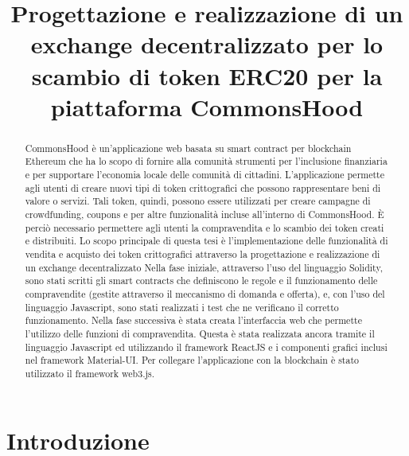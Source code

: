 \documentclass[a4paper]{article}
\title{Progettazione e realizzazione di un exchange decentralizzato per lo scambio di token ERC20 per la piattaforma CommonsHood}
\begin{document}
    \renewcommand{\abstractname}{Abstract}
    \begin{abstract}
      CommonsHood è un’applicazione web basata su smart contract per blockchain Ethereum che ha lo scopo di fornire alla comunità strumenti per l’inclusione finanziaria e per supportare l’economia locale delle comunità di cittadini.
      L’applicazione permette agli utenti di creare nuovi tipi di token crittografici che possono rappresentare  beni di valore o servizi. Tali token, quindi, possono essere utilizzati per creare campagne di crowdfunding, coupons e per altre funzionalità incluse all’interno di CommonsHood. È perciò necessario permettere agli utenti la compravendita e lo scambio dei token creati e distribuiti.
      Lo scopo principale di questa tesi è l’implementazione delle funzionalità di vendita e acquisto dei token crittografici attraverso la progettazione e realizzazione di un exchange decentralizzato
      Nella fase iniziale, attraverso l’uso del linguaggio Solidity, sono stati scritti gli smart contracts che definiscono le regole e il funzionamento delle compravendite (gestite attraverso il meccanismo di domanda e offerta), e, con l’uso del linguaggio Javascript, sono stati realizzati i test che ne verificano il corretto funzionamento.
      Nella fase successiva è stata creata l’interfaccia web che permette l’utilizzo delle funzioni di compravendita. Questa è stata realizzata ancora tramite il linguaggio Javascript ed utilizzando il framework ReactJS e i componenti grafici inclusi nel framework Material-UI. Per collegare l’applicazione con la blockchain è stato utilizzato il framework web3.js.
    \end{abstract}
    \newpage
    \tableofcontents
    \newpage
    \section{Introduzione}
\end{document}
